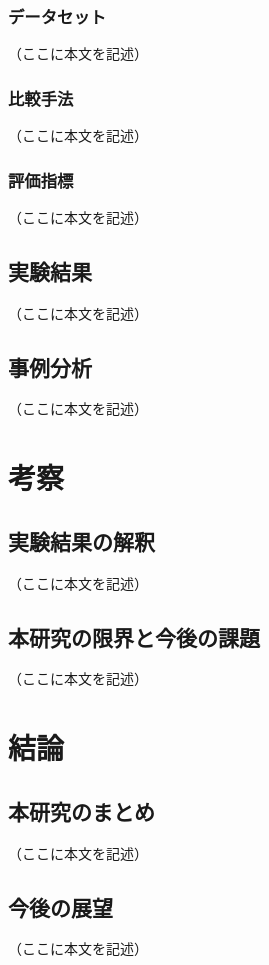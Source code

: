 \documentclass[12pt]{bxjsreport}
\begin{document}
\subsection{データセット}
（ここに本文を記述）

\subsection{比較手法}
（ここに本文を記述）

\subsection{評価指標}
（ここに本文を記述）

\section{実験結果}
（ここに本文を記述）

\section{事例分析}
（ここに本文を記述）

\chapter{考察}

\section{実験結果の解釈}
（ここに本文を記述）

\section{本研究の限界と今後の課題}
（ここに本文を記述）

\chapter{結論}

\section{本研究のまとめ}
（ここに本文を記述）

\section{今後の展望}
（ここに本文を記述）
\end{document}
